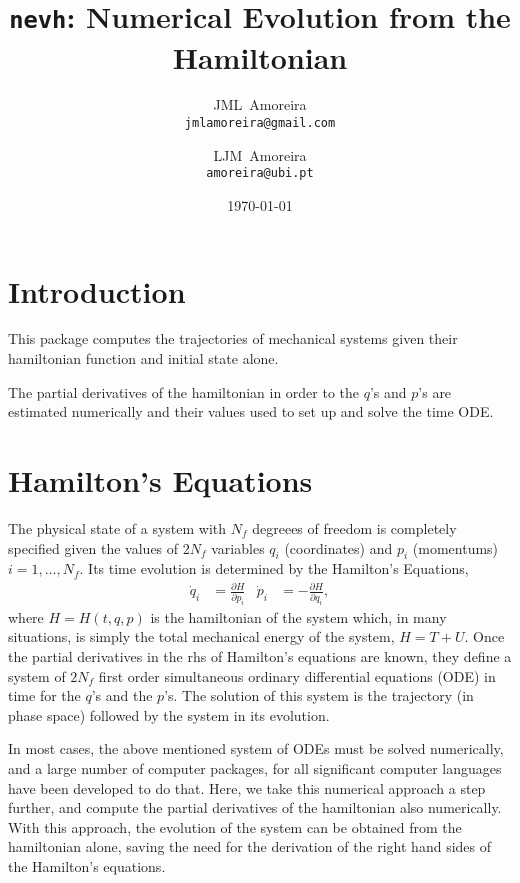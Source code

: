 \documentclass{article}
\title{\texttt{nevh}: Numerical Evolution from the Hamiltonian}
\date{\today}
\author{JML~Amoreira\\
  \texttt{jmlamoreira@gmail.com}
  \and LJM~Amoreira\\
  \texttt{amoreira@ubi.pt}
}
\newcommand{\pd}[2]{\frac{\partial#1}{\partial#2}}
\begin{document}
\maketitle
\section{Introduction}
This package computes the trajectories of mechanical systems given their
hamiltonian function and initial state alone.

The partial derivatives of the hamiltonian in order to the $q$'s and $p$'s are
estimated numerically and their values used to set up and solve the time ODE.

\section{Hamilton's Equations}
The physical state of a system with $N_f$ degreees of freedom is completely
specified given the values of $2N_f$ variables $q_i$ (coordinates) and $p_i$
(momentums) $i=1,\ldots,N_f$.  Its time evolution is determined by the
Hamilton's Equations,
\begin{align}
  \dot q_i&=\pd{H}{p_i}&
  \dot p_i&=-\pd{H}{q_i},
\end{align}
where $H=H(t,q,p)$ is the hamiltonian of the system which, in many situations,
is simply the total mechanical energy of the system, $H=T+U$. Once the partial
derivatives in the rhs of Hamilton's equations are known, they define a system
of $2N_f$ first order simultaneous ordinary differential equations (ODE) in time
for the $q$'s and the $p$'s. The solution of this system is the trajectory (in
phase space) followed by the system in its evolution.

In most cases, the above mentioned system of ODEs must be solved numerically,
and a large number of computer packages, for all significant computer languages
have been developed to do that. Here, we take this numerical approach a step
further, and compute the partial derivatives of the hamiltonian also
numerically. With this approach, the evolution of the system can be obtained
from the hamiltonian alone, saving the need for the derivation of the right hand
sides of the Hamilton's equations. 
\end{document}
